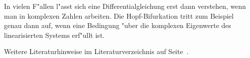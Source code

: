 In vielen F"allen l"asst sich eine Differentialgleichung erst dann
verstehen, wenn man in komplexen Zahlen arbeiten. 
Die Hopf-Bifurkation tritt zum Beispiel genau dann auf, wenn eine
Bedingung "uber die komplexen Eigenwerte des linearisierten Systems
erf"ullt ist.

Weitere Literaturhinweise im Literaturverzeichnis auf
Seite~\pageref{skript:literatur}.


